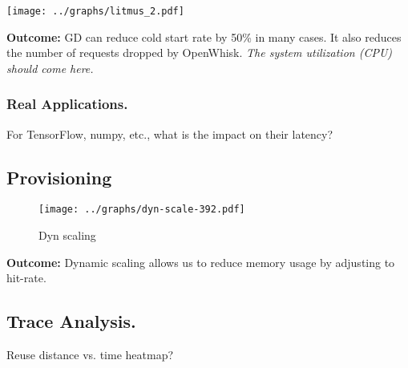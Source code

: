 \texttt{[image: ../graphs/litmus\_2.pdf]}

\textbf{Outcome:} GD can reduce cold start rate by 50\% in many cases. It also reduces the number of requests dropped by OpenWhisk. \emph{The system utilization (CPU) should come here.}


\subsubsection{Real Applications.}

For TensorFlow, numpy, etc., what is the impact on their latency?

\subsection{Provisioning}

\begin{figure}[t]
  \centering
  \texttt{[image: ../graphs/dyn-scale-392.pdf]}  
  \caption{Dyn scaling}
  \label{fig:dyn-scale}
\end{figure}


\textbf{Outcome:} Dynamic scaling allows us to reduce memory usage by adjusting to hit-rate. 


\subsection{Trace Analysis.}

Reuse distance vs. time heatmap? 